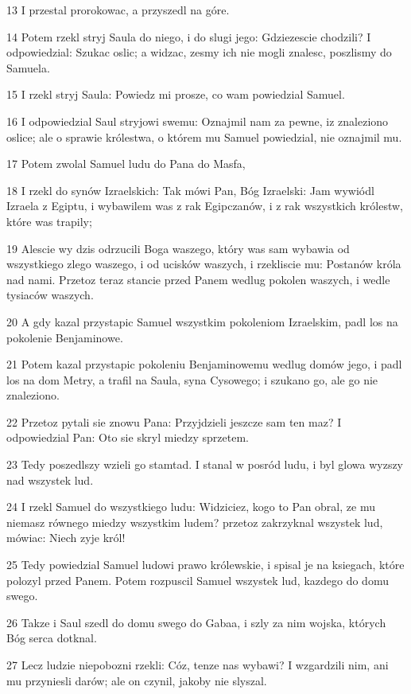 \par 13 I przestal prorokowac, a przyszedl na góre.
\par 14 Potem rzekl stryj Saula do niego, i do slugi jego: Gdziezescie chodzili? I odpowiedzial: Szukac oslic; a widzac, zesmy ich nie mogli znalesc, poszlismy do Samuela.
\par 15 I rzekl stryj Saula: Powiedz mi prosze, co wam powiedzial Samuel.
\par 16 I odpowiedzial Saul stryjowi swemu: Oznajmil nam za pewne, iz znaleziono oslice; ale o sprawie królestwa, o którem mu Samuel powiedzial, nie oznajmil mu.
\par 17 Potem zwolal Samuel ludu do Pana do Masfa,
\par 18 I rzekl do synów Izraelskich: Tak mówi Pan, Bóg Izraelski: Jam wywiódl Izraela z Egiptu, i wybawilem was z rak Egipczanów, i z rak wszystkich królestw, które was trapily;
\par 19 Alescie wy dzis odrzucili Boga waszego, który was sam wybawia od wszystkiego zlego waszego, i od ucisków waszych, i rzekliscie mu: Postanów króla nad nami. Przetoz teraz stancie przed Panem wedlug pokolen waszych, i wedle tysiaców waszych.
\par 20 A gdy kazal przystapic Samuel wszystkim pokoleniom Izraelskim, padl los na pokolenie Benjaminowe.
\par 21 Potem kazal przystapic pokoleniu Benjaminowemu wedlug domów jego, i padl los na dom Metry, a trafil na Saula, syna Cysowego; i szukano go, ale go nie znaleziono.
\par 22 Przetoz pytali sie znowu Pana: Przyjdzieli jeszcze sam ten maz? I odpowiedzial Pan: Oto sie skryl miedzy sprzetem.
\par 23 Tedy poszedlszy wzieli go stamtad. I stanal w posród ludu, i byl glowa wyzszy nad wszystek lud.
\par 24 I rzekl Samuel do wszystkiego ludu: Widziciez, kogo to Pan obral, ze mu niemasz równego miedzy wszystkim ludem? przetoz zakrzyknal wszystek lud, mówiac: Niech zyje król!
\par 25 Tedy powiedzial Samuel ludowi prawo królewskie, i spisal je na ksiegach, które polozyl przed Panem. Potem rozpuscil Samuel wszystek lud, kazdego do domu swego.
\par 26 Takze i Saul szedl do domu swego do Gabaa, i szly za nim wojska, których Bóg serca dotknal.
\par 27 Lecz ludzie niepobozni rzekli: Cóz, tenze nas wybawi? I wzgardzili nim, ani mu przyniesli darów; ale on czynil, jakoby nie slyszal.

